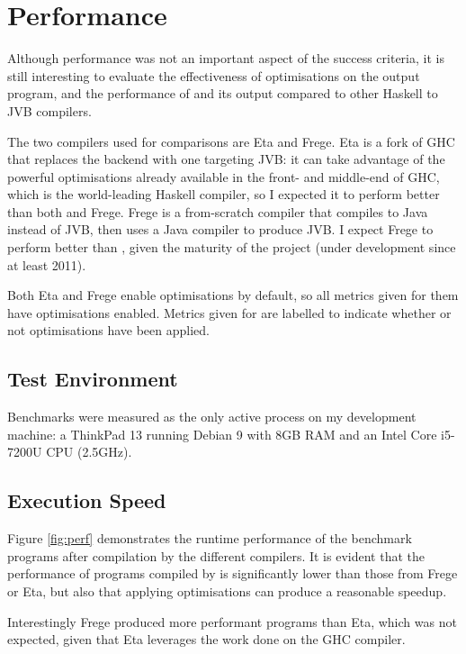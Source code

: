 \documentclass[dissertation.tex]{subfiles}
\begin{document}
\section{Performance}
{
    Although performance was not an important aspect of the success criteria, it is still interesting to evaluate the effectiveness of optimisations on the output program, and the performance of \compilername and its output compared to other Haskell to JVB compilers.

    The two compilers used for comparisons are Eta and Frege. Eta is a fork of GHC that replaces the backend with one targeting JVB: it can take advantage of the powerful optimisations already available in the front- and middle-end of GHC, which is the world-leading Haskell compiler, so I expected it to perform better than both \compilername and Frege. Frege is a from-scratch compiler that compiles to Java instead of JVB, then uses a Java compiler to produce JVB. I expect Frege to perform better than \compilername, given the maturity of the project (under development since at least 2011).

    Both Eta and Frege enable optimisations by default, so all metrics given for them have optimisations enabled. Metrics given for \compilername are labelled to indicate whether or not optimisations have been applied.

    \subsection{Test Environment}\label{sec:test-environment}
    {
        Benchmarks were measured as the only active process on my development machine: a ThinkPad 13 running Debian 9 with 8GB RAM and an Intel Core i5-7200U CPU (2.5GHz).
    }
    \subsection{Execution Speed}
    {
        Figure \ref{fig:perf} demonstrates the runtime performance of the benchmark programs after compilation by the different compilers. It is evident that the performance of programs compiled by \compilername is significantly lower than those from Frege or Eta, but also that applying optimisations can produce a reasonable speedup.

        Interestingly Frege produced more performant programs than Eta, which was not expected, given that Eta leverages the work done on the GHC compiler.

}}
\end{document}
